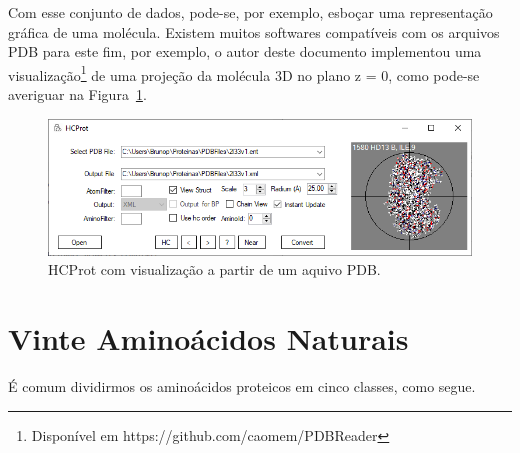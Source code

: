 Com esse conjunto de dados, pode-se, por exemplo, esboçar uma representação gráfica de uma molécula. Existem muitos softwares compatíveis com os arquivos PDB para este fim, por exemplo, o autor deste documento implementou uma visualização\footnote{Disponível em https://github.com/caomem/PDBReader} de uma projeção da molécula 3D no plano z = 0, como pode-se averiguar na Figura~\ref{fig:molproj}.

\begin{figure}[H]
	\begin{center}
		\includegraphics[width=1\linewidth]{secProteins/figures/molproj.png}
	\end{center}
	\caption{HCProt com visualização a partir de um aquivo PDB.}
	\label{fig:molproj}
\end{figure}

\chapter{Vinte Aminoácidos Naturais\label{ap:amino}} 

É comum dividirmos os aminoácidos proteicos em cinco classes, como segue.
